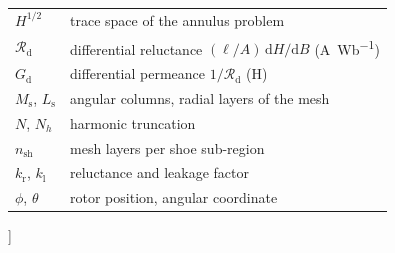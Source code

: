 \documentclass[10pt,a4paper,twocolumn]{article}
\theoremstyle{plain}
\theoremstyle{remark}
\begin{document}
{{\begin{tabular}{@{}p{16mm}p{56mm}@{}}
$H^{1/2}$ & trace space of the annulus problem\\
$\mathcal{R}_{\mathrm{d}}$ & differential reluctance $(\ell/A)\,\mathrm{d}H/\mathrm{d}B$ (\si{\ampere\per\weber})\\
$G_{\mathrm{d}}$ & differential permeance $1/\mathcal{R}_{\mathrm{d}}$ (\si{\henry})\\
$M_{\mathrm{s}}$, $L_{\mathrm{s}}$ & angular columns, radial layers of the mesh\\
$N$, $N_h$ & harmonic truncation\\
$n_{\mathrm{sh}}$ & mesh layers per shoe sub-region\\
$k_{\mathrm{r}}$, $k_{\mathrm{l}}$ & reluctance and leakage factor\\
$\phi$, $\theta$ & rotor position, angular coordinate\\
\end{tabular}}\par}

]

\clearpage

\vspace{4mm}
\end{document}
